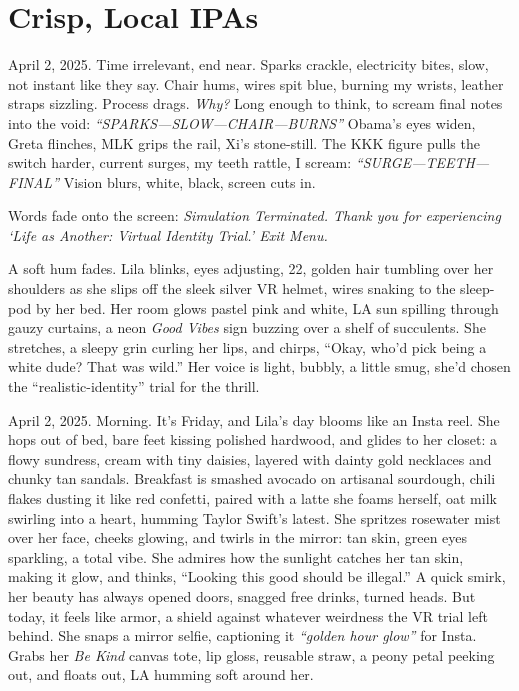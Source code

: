 \documentclass[12pt]{article}
\begin{document}
{\section{Crisp, Local IPAs}

April 2, 2025. Time irrelevant, end near. Sparks crackle, electricity bites, slow, not instant like they say. Chair hums, wires spit blue, burning my wrists, leather straps sizzling. Process drags. \textit{Why?} Long enough to think, to scream final notes into the void: \textit{“SPARKS—SLOW—CHAIR—BURNS”} \textnormal{Obama}’s eyes widen, \textnormal{Greta} flinches, \textnormal{MLK} grips the rail, \textnormal{Xi}’s stone-still. The KKK figure pulls the switch harder, current surges, my teeth rattle, I scream: \textit{“SURGE—TEETH—FINAL”} Vision blurs, white, black, screen cuts in.

Words fade onto the screen: \textit{Simulation Terminated. Thank you for experiencing ‘Life as Another: Virtual Identity Trial.’ Exit Menu.}

A soft hum fades. \textnormal{Lila} blinks, eyes adjusting, 22, golden hair tumbling over her shoulders as she slips off the sleek silver VR helmet, wires snaking to the sleep-pod by her bed. Her room glows pastel pink and white, LA sun spilling through gauzy curtains, a neon \textit{Good Vibes} sign buzzing over a shelf of succulents. She stretches, a sleepy grin curling her lips, and chirps, “Okay, who’d pick being a white dude? That was wild.” Her voice is light, bubbly, a little smug, she’d chosen the “realistic-identity” trial for the thrill.

April 2, 2025. Morning. It’s Friday, and \textnormal{Lila}’s day blooms like an Insta reel. She hops out of bed, bare feet kissing polished hardwood, and glides to her closet: a flowy sundress, cream with tiny daisies, layered with dainty gold necklaces and chunky tan sandals. Breakfast is smashed avocado on artisanal sourdough, chili flakes dusting it like red confetti, paired with a latte she foams herself, oat milk swirling into a heart, humming \textnormal{Taylor Swift}’s latest. She spritzes rosewater mist over her face, cheeks glowing, and twirls in the mirror: tan skin, green eyes sparkling, a total vibe. She admires how the sunlight catches her tan skin, making it glow, and thinks, “Looking this good should be illegal.” A quick smirk, her beauty has always opened doors, snagged free drinks, turned heads. But today, it feels like armor, a shield against whatever weirdness the VR trial left behind. She snaps a mirror selfie, captioning it \textit{“golden hour glow”} for Insta. Grabs her \textit{Be Kind} canvas tote, lip gloss, reusable straw, a peony petal peeking out, and floats out, LA humming soft around her.

}
\end{document}
